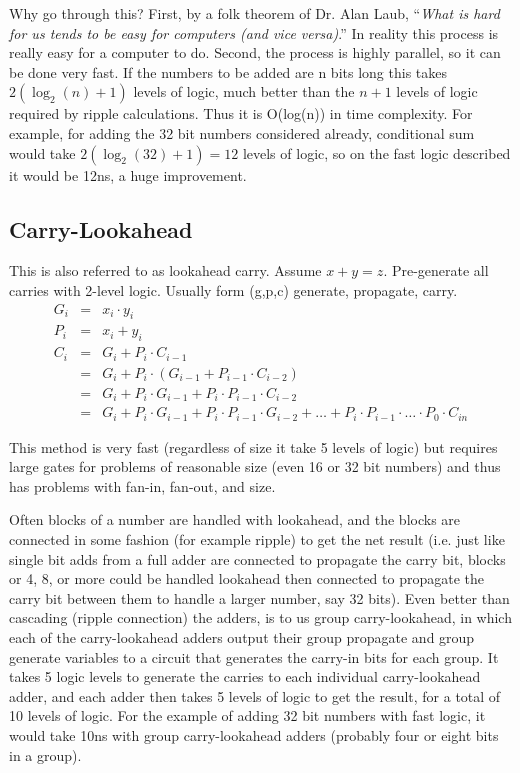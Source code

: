 Why go through this?  First, by a folk theorem of Dr. Alan Laub, ``\emph{What is hard for us tends to be easy for computers (and vice versa)}.''  In reality this process is really easy for a computer to do.  Second, the process is highly parallel, so it can be done very fast.  If the numbers to be added are n bits long this takes $2(\log_2(n)+1)$ levels of logic, much better than the $n+1$ levels of logic required by ripple calculations.  Thus it is O(log(n)) in time complexity.  For example, for adding the 32 bit numbers considered already, conditional sum would take $2(\log_2(32)+1)=12$ levels of logic, so on the fast logic described it would be 12ns, a huge improvement.

\subsection{Carry-Lookahead}

This is also referred to as lookahead carry.  Assume $x+y=z$.  Pre-generate all carries with 2-level logic. Usually form (g,p,c) generate, propagate, carry.
\begin{eqnarray}
G_i & = & x_i \cdot y_i \\
P_i & = & x_i + y_i \\
C_i & = & G_i + P_i \cdot C_{i-1} \\
    & = & G_i + P_i \cdot (G_{i-1} + P_{i-1} \cdot C_{i-2}) \\
    & = & G_i + P_i \cdot G_{i-1} + P_i \cdot P_{i-1} \cdot C_{i-2} \\
    & = & G_i + P_i \cdot G_{i-1} + P_i \cdot P_{i-1} \cdot G_{i-2} +
    \ldots + P_i \cdot P_{i-1} \cdot \ldots \cdot P_0 \cdot C_{in}
\end{eqnarray}

This method is very fast (regardless of size it take 5 levels of logic) but requires large gates for problems of reasonable size (even 16 or 32 bit numbers) and thus has problems with fan-in, fan-out, and size.

Often blocks of a number are handled with lookahead, and the blocks are connected in some fashion (for example ripple) to get the net result (i.e. just like single bit adds from a full adder are connected to propagate the carry bit, blocks or 4, 8, or more could be handled lookahead then connected to propagate the carry bit between them to handle a larger number, say 32 bits).  Even better than cascading (ripple connection) the adders, is to us group carry-lookahead, in which each of the carry-lookahead adders output their group propagate and group generate variables to a circuit that generates the carry-in bits for each group.  It takes 5 logic levels to generate the carries to each individual carry-lookahead adder, and each adder then takes 5 levels of logic to get the result, for a total of 10 levels of logic.  For the example of adding 32 bit numbers with fast logic, it would take 10ns with group carry-lookahead adders (probably four or eight bits in a group).


